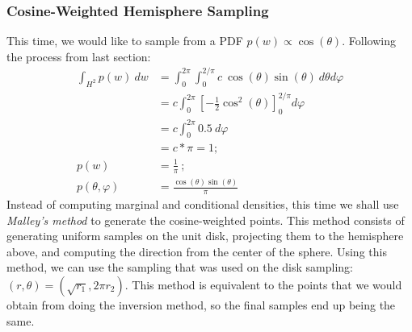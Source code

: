 \subsubsection*{Cosine-Weighted Hemisphere Sampling}
This time, we would like to sample from a PDF $p(w)\propto\cos(\theta)$. Following the process from last section:
\begin{align*}
\int_{H^{2}}p(w)\  dw
&=\int_{0}^{2\pi}\int_{0}^{2/\pi}c\ \cos(\theta)\sin(\theta)\ d\theta d\varphi \\
&= c\int_{0}^{2\pi}\left[-\frac{1}{2}\cos^{2}(\theta)\right]^{2/\pi}_{0} d\varphi \\
&= c\int_{0}^{2\pi}0.5\ d\varphi \\
&=c*\pi=1; \\ 
p(w) &=\frac{1}{\pi}\ ;\\
p(\theta, \varphi) &= \frac{\cos(\theta)\sin(\theta)}{\pi} 
\end{align*}
Instead of computing marginal and conditional densities, this time we shall use \textit{Malley's method} to generate the cosine-weighted points. This method consists of generating uniform samples on the unit disk, projecting them to the hemisphere above, and computing the direction from the center of the sphere. 
Using this method, we can use the sampling that was used on the disk sampling: $(r,\theta)=(\sqrt{r_{1}}, 2\pi r_{2})$. This method is equivalent to the points that we would obtain from doing the inversion method, so the final samples end up being the same.
